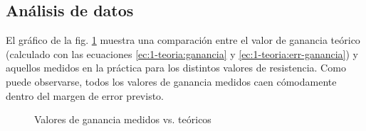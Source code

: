 \subsection{Análisis de datos}

El gráfico de la fig. \ref{fig:1-analisis:ganancia} muestra una comparación
entre el valor de ganancia teórico (calculado con las ecuaciones 
\ref{ec:1-teoria:ganancia} y \ref{ec:1-teoria:err-ganancia}) y aquellos 
medidos en la práctica para los distintos valores de resistencia. Como puede
observarse, todos los valores de ganancia medidos caen cómodamente dentro
del margen de error previsto.

\begin{figure}[H]
    \centering
    
    \caption{Valores de ganancia medidos vs. teóricos}
    \label{fig:1-analisis:ganancia}
\end{figure}
